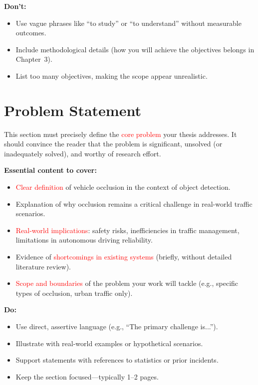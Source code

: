 \documentclass[12pt,a4paper]{report}
\theoremstyle{definition}
\theoremstyle{remark}
\begin{document}
\noindent \textbf{Don’t:}
\begin{itemize}
    \item Use vague phrases like ``to study'' or ``to understand'' without measurable outcomes.
    \item Include methodological details (how you will achieve the objectives belongs in Chapter~3).
    \item List too many objectives, making the scope appear unrealistic.
\end{itemize}

\section{Problem Statement}
\label{sec:problem-statement}

This section must precisely define the \textcolor{red}{core problem} your thesis addresses. It should convince the reader that the problem is significant, unsolved (or inadequately solved), and worthy of research effort.

\noindent \textbf{Essential content to cover:}
\begin{itemize}
    \item \textcolor{red}{Clear definition} of vehicle occlusion in the context of object detection.
    \item Explanation of why occlusion remains a critical challenge in real-world traffic scenarios.
    \item \textcolor{red}{Real-world implications}: safety risks, inefficiencies in traffic management, limitations in autonomous driving reliability.
    \item Evidence of \textcolor{red}{shortcomings in existing systems} (briefly, without detailed literature review).
    \item \textcolor{red}{Scope and boundaries} of the problem your work will tackle (e.g., specific types of occlusion, urban traffic only).
\end{itemize}

\noindent \textbf{Do:}
\begin{itemize}
    \item Use direct, assertive language (e.g., ``The primary challenge is...'').
    \item Illustrate with real-world examples or hypothetical scenarios.
    \item Support statements with references to statistics or prior incidents.
    \item Keep the section focused—typically 1--2 pages.
\end{itemize}
\end{document}
